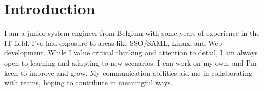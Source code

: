 \section{Introduct\textcolor{mycolor}{ion}}
\begin{center}
  I am a junior \textcolor{mycolor}{system engineer} from Belgium with some years of experience in the IT field. I've had exposure to areas like \textcolor{mycolor}{SSO/SAML, Linux, and Web development}. While I value critical thinking and attention to detail, I am always open to learning and adapting to new scenarios. I can work on my own, and I'm keen to improve and grow. My communication abilities aid me in collaborating with teams, hoping to contribute in meaningful ways.
\end{center}

